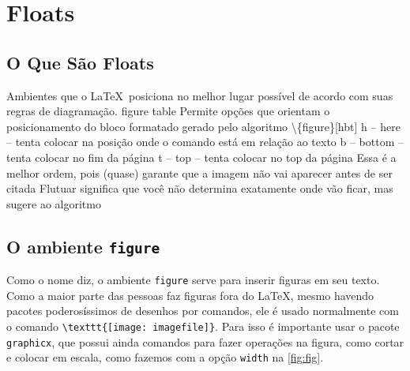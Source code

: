\section{Floats}
\subsection{O Que São Floats}

    \begin{outline}
        \1 Ambientes que o \LaTeX\ posiciona no melhor lugar possível de acordo com suas regras de diagramação.
        \2 figure
        \2 table
        \1 Permite opções que orientam o posicionamento do bloco formatado gerado pelo algoritmo
        \2 \textbackslash \{figure\}[hbt]
        \3 h -- here -- tenta colocar na posição onde o comando está em relação ao texto
        \3 b -- bottom -- tenta colocar no fim da página
        \3 t -- top -- tenta colocar no top da página
        \2 Essa é a melhor ordem, pois (quase) garante que a imagem não vai aparecer antes de ser citada
        \1 Flutuar significa que você não determina exatamente onde vão ficar, mas sugere ao algoritmo 
    \end{outline}


\subsection{O ambiente \lstinline|figure|}

Como o nome diz, o ambiente \lstinline|figure| serve para inserir figuras em seu texto. Como a maior parte das pessoas faz figuras fora do \LaTeX, mesmo havendo pacotes poderosíssimos de desenhos por comandos, ele é usado normalmente com o comando
\lstinline|\texttt{[image: imagefile]}|. Para isso é importante usar o pacote \lstinline|graphicx|, que possui ainda comandos para fazer operações na figura, como cortar e colocar em escala, como fazemos com a opção \lstinline|width| na \ref{fig:fig}.


